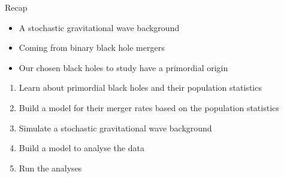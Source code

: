 \begin{frame}{Recap}
\begin{itemize}[<+->]
	\item A stochastic gravitational wave background
	\item Coming from binary black hole mergers
	\item Our chosen black holes to study have a primordial origin
\end{itemize}
\vskip 1cm
\begin{enumerate}[<+->]
	\item Learn about primordial black holes and their population statistics
	\item Build a model for their merger rates based on the population statistics
	\item Simulate a stochastic gravitational wave background
	\item Build a model to analyse the data
	\item Run the analyses
\end{enumerate}
\end{frame}